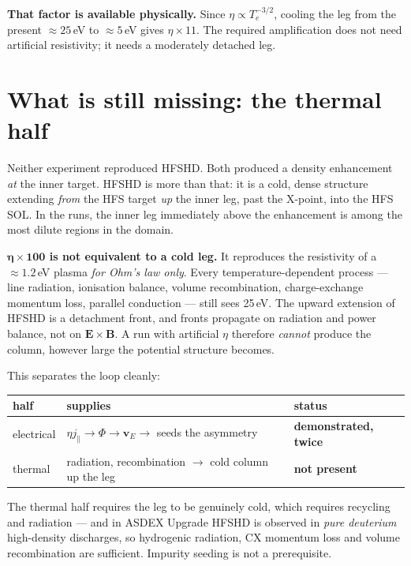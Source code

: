 \documentclass[11pt,a4paper]{article}
\newcommand{\jpar}{j_\parallel}
\newcommand{\vE}{\bm v_E}
\begin{document}
\begin{keybox}
\textbf{That factor is available physically.} Since $\eta\propto T_e^{-3/2}$, cooling the leg
from the present $\approx\!25$\,eV to $\approx\!5$\,eV gives $\eta\times11$. The required
amplification does not need artificial resistivity; it needs a moderately detached leg.
\end{keybox}

\section{What is still missing: the thermal half}

Neither experiment reproduced HFSHD. Both produced a density enhancement \emph{at} the inner
target. HFSHD is more than that: it is a cold, dense structure extending \emph{from} the HFS
target \emph{up} the inner leg, past the X-point, into the HFS SOL. In the runs, the inner leg
immediately above the enhancement is among the most dilute regions in the domain.

\begin{caution}
\textbf{$\bm{\eta\times100}$ is not equivalent to a cold leg.} It reproduces the resistivity of
a $\approx\!1.2$\,eV plasma \emph{for Ohm's law only}. Every temperature-dependent process ---
line radiation, ionisation balance, volume recombination, charge-exchange momentum loss,
parallel conduction --- still sees 25\,eV. The upward extension of HFSHD is a detachment front,
and fronts propagate on radiation and power balance, not on $\bm E\times\bm B$. A run with
artificial $\eta$ therefore \emph{cannot} produce the column, however large the potential
structure becomes.
\end{caution}

\noindent This separates the loop cleanly:

\begin{center}
\begin{tabular}{lll}
\toprule
half & supplies & status \\
\midrule
electrical & $\eta\jpar \to \Phi \to \vE \to$ seeds the asymmetry & \textbf{demonstrated, twice} \\
thermal    & radiation, recombination $\to$ cold column up the leg & \textbf{not present} \\
\bottomrule
\end{tabular}
\end{center}

\noindent The thermal half requires the leg to be genuinely cold, which requires
recycling and radiation --- and in ASDEX Upgrade HFSHD is observed in \emph{pure deuterium}
high-density discharges, so hydrogenic radiation, CX momentum loss and volume recombination
are sufficient. Impurity seeding is not a prerequisite.
\end{document}
